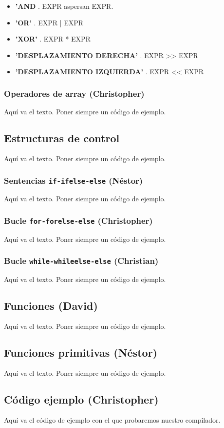 \documentclass[11pt, english]{article}
\begin{document}
\begin{itemize}
	\item \textbf{'AND} .  {EXPR}  aspersan {EXPR}.
	\item \textbf{'OR'} . {EXPR} | {EXPR}
	\item \textbf{'XOR'} . {EXPR} * {EXPR}
	\item \textbf{'DESPLAZAMIENTO DERECHA'} . {EXPR} >> {EXPR}
	\item \textbf{'DESPLAZAMIENTO IZQUIERDA'} . {EXPR} << {EXPR}

\end{itemize}

\subsubsection{Operadores de array (Christopher)}
Aquí va el texto. Poner siempre un código de ejemplo.
\newpage

\subsection{Estructuras de control}
Aquí va el texto. Poner siempre un código de ejemplo.

\subsubsection{Sentencias \texttt{if-ifelse-else} (Néstor)}
Aquí va el texto. Poner siempre un código de ejemplo.

\subsubsection{Bucle \texttt{for-forelse-else} (Christopher)}
Aquí va el texto. Poner siempre un código de ejemplo.

\subsubsection{Bucle \texttt{while-whileelse-else} (Christian)}
Aquí va el texto. Poner siempre un código de ejemplo.
\newpage

\subsection{Funciones (David)}
Aquí va el texto. Poner siempre un código de ejemplo.
\newpage

\subsection{Funciones primitivas (Néstor)}
Aquí va el texto. Poner siempre un código de ejemplo.
\newpage

\subsection{Código ejemplo (Christopher)}
Aquí va el código de ejemplo con el que probaremos nuestro compilador.
\end{document}
